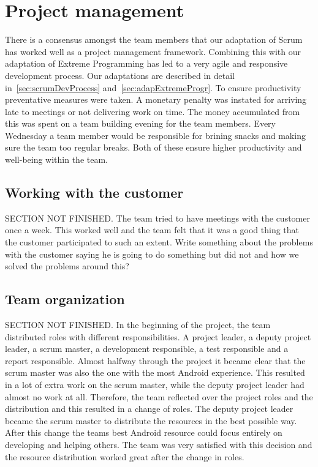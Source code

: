 \section{Project management}
There is a consensus amongst the team members that our adaptation of Scrum has worked well as a project management framework. Combining this with our adaptation of Extreme Programming has led to a very agile and responsive development process. Our adaptations are described in detail in~\ref{sec:scrumDevProcess} and~\ref{sec:adapExtremeProgr}. To ensure productivity preventative measures were taken. A monetary penalty was instated for arriving late to meetings or not delivering work on time. The money accumulated from this was spent on a team building evening for the team members. Every Wednesday a team member would be responsible for brining snacks and making sure the team too regular breaks. Both of these ensure higher productivity and well-being within the team.

\subsection{Working with the customer}
SECTION NOT FINISHED. The team tried to have meetings with the customer once a week. This worked well and the team felt that it was a good thing that the customer participated to such an extent. Write something about the problems with the customer saying he is going to do something but did not and how we solved the problems around this?

\subsection{Team organization}
SECTION NOT FINISHED.
In the beginning of the project, the team distributed roles with different responsibilities. A project leader, a deputy project leader, a scrum master, a development responsible, a test responsible and a report responsible. Almost halfway through the project it became clear that the scrum master was also the one with the most Android experience. This resulted in a lot of extra work on the scrum master, while the deputy project leader had almost no work at all. Therefore, the team reflected over the project roles and the distribution and this resulted in a change of roles. The deputy project leader became the scrum master to distribute the resources in the best possible way. After this change the teams best Android resource could focus entirely on developing and helping others. The team was very satisfied with this decision and the resource distribution worked great after the change in roles. 

